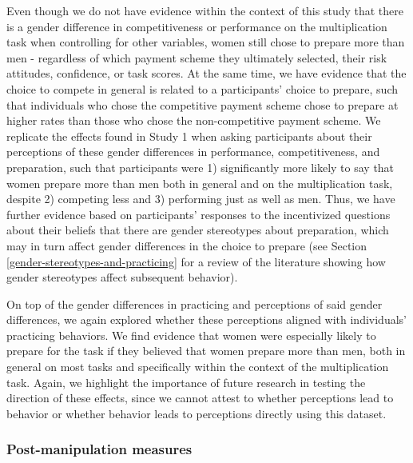 \documentclass[a4paper, nobind]{templates/ociamthesis}
\begin{document}
Even though we do not have evidence within the context of this study that there is a gender difference in competitiveness or performance on the multiplication task when controlling for other variables, women still chose to prepare more than men - regardless of which payment scheme they ultimately selected, their risk attitudes, confidence, or task scores. At the same time, we have evidence that the choice to compete in general is related to a participants' choice to prepare, such that individuals who chose the competitive payment scheme chose to prepare at higher rates than those who chose the non-competitive payment scheme. We replicate the effects found in Study 1 when asking participants about their perceptions of these gender differences in performance, competitiveness, and preparation, such that participants were 1) significantly more likely to say that women prepare more than men both in general and on the multiplication task, despite 2) competing less and 3) performing just as well as men. Thus, we have further evidence based on participants' responses to the incentivized questions about their beliefs that there are gender stereotypes about preparation, which may in turn affect gender differences in the choice to prepare (see Section \ref{gender-stereotypes-and-practicing} for a review of the literature showing how gender stereotypes affect subsequent behavior).

On top of the gender differences in practicing and perceptions of said gender differences, we again explored whether these perceptions aligned with individuals' practicing behaviors. We find evidence that women were especially likely to prepare for the task if they believed that women prepare more than men, both in general on most tasks and specifically within the context of the multiplication task. Again, we highlight the importance of future research in testing the direction of these effects, since we cannot attest to whether perceptions lead to behavior or whether behavior leads to perceptions directly using this dataset.

\hypertarget{post-manipulation-measures-1}{%
\subsubsection{Post-manipulation measures}\label{post-manipulation-measures-1}}
\end{document}
